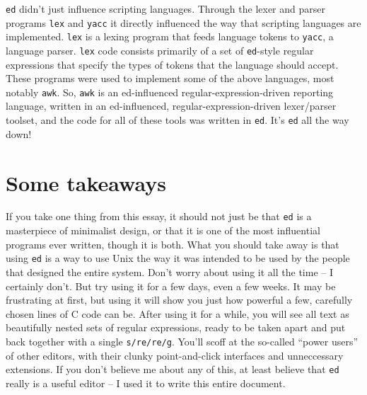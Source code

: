 \documentclass[12pt]{article}
\begin{document}
\lstinline{ed} didn't just influence scripting languages. Through the lexer and parser
programs \lstinline{lex} and \lstinline{yacc} it directly influenced the way that
scripting languages are implemented. \lstinline{lex} is a lexing program that feeds
language tokens to \lstinline{yacc}, a language parser. \lstinline{lex} code consists
primarily of a set of \lstinline{ed}-style regular expressions that specify
the types of tokens that the language should accept. These programs were used to implement
some of the above languages, most notably \lstinline{awk}. So, \lstinline{awk} is an ed-influenced
regular-expression-driven reporting language, written in an ed-influenced, regular-expression-driven lexer/parser toolset,
and the code for all of these tools was written in \lstinline{ed}. It's \lstinline{ed} all the way down!

\section{Some takeaways}

If you take one thing from this essay, it should not just be that \lstinline{ed} is
a masterpiece of minimalist design, or that it is one of the most influential programs
ever written, though it is both. What you should take away is that using \lstinline{ed}
is a way to use Unix the way it was intended to be used by the people that designed
the entire system. Don't worry about using it all the time -- I certainly don't. But try
using it for a few days, even a few weeks. It may be frustrating at first, but using
it will show you just how powerful a few, carefully chosen lines of C code can be.
After using it for a while, you will see all text as beautifully nested sets of
regular expressions, ready to be taken apart and put back together with a single
\lstinline{s/re/re/g}. You'll scoff at the so-called ``power users'' of other editors,
with their clunky point-and-click interfaces and unneccessary extensions.
If you don't believe me about any of this, at least believe that \lstinline{ed} really
is a useful editor -- I used it to write this entire document.



\end{document}
